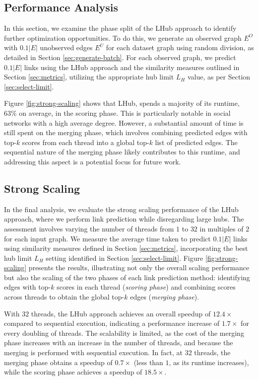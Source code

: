 \subsection{Performance Analysis}

In this section, we examine the phase split of the LHub approach to identify further optimization opportunities. To do this, we generate an observed graph $E^O$ with $0.1|E|$ unobserved edges $E^U$ for each dataset graph using random division, as detailed in Section \ref{sec:generate-batch}. For each observed graph, we predict $0.1|E|$ links using the LHub approach and the similarity measures outlined in Section \ref{sec:metrics}, utilizing the appropriate hub limit $L_H$ value, as per Section \ref{sec:select-limit}.

Figure \ref{fig:strong-scaling} shows that LHub, spends a majority of its runtime, $63\%$ on average, in the scoring phase. This is particularly notable in social networks with a high average degree. However, a substantial amount of time is still spent on the merging phase, which involves combining predicted edges with top-$k$ scores from each thread into a global top-$k$ list of predicted edges. The sequential nature of the merging phase likely contributes to this runtime, and addressing this aspect is a potential focus for future work.




\subsection{Strong Scaling}

In the final analysis, we evaluate the strong scaling performance of the LHub approach, where we perform link prediction while disregarding large hubs. The assessment involves varying the number of threads from $1$ to $32$ in multiples of $2$ for each input graph. We measure the average time taken to predict $0.1|E|$ links using similarity measures defined in Section \ref{sec:metrics}, incorporating the best hub limit $L_H$ setting identified in Section \ref{sec:select-limit}. Figure \ref{fig:strong-scaling} presents the results, illustrating not only the overall scaling performance but also the scaling of the two phases of each link prediction method: identifying edges with top-$k$ scores in each thread (\textit{scoring phase}) and combining scores across threads to obtain the global top-$k$ edges (\textit{merging phase}).

With $32$ threads, the LHub approach achieves an overall speedup of $12.4\times$ compared to sequential execution, indicating a performance increase of $1.7\times$ for every doubling of threads. The scalability is limited, as the cost of the merging phase increases with an increase in the number of threads, and because the merging is performed with sequential execution. In fact, at $32$ threads, the merging phase obtains a speedup of $0.7\times$ (less than $1$, as its runtime increases), while the scoring phase achieves a speedup of $18.5\times$.
